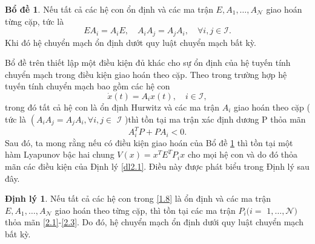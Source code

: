 \documentclass[12pt,a4paper]{report}
\theoremstyle{definition}
\newtheorem{dl}{Định lý}
\newtheorem{lemma}{Bổ đề}
\theoremstyle{definition}
\numberwithin{dl}{chapter}
\numberwithin{vd}{chapter}
\numberwithin{corollary}{chapter}
\numberwithin{lemma}{chapter}
\numberwithin{md}{chapter}
\numberwithin{dn}{chapter}
\numberwithin{cy}{chapter}
\numberwithin{nx}{chapter}
\begin{document}
\begin{lemma} \label{bd2.1}\cite{Zhai09a} Nếu tất cả các hệ con ổn định và các ma trận $E, A_{1}, \ldots, A_{\mathcal{N}}$ giao hoán từng cặp, tức là\\
\begin{equation}\label{2.29}
E A_{i}=A_{i} E, \quad A_{i} A_{j}=A_{j} A_{i}, \quad \forall i, j \in \mathcal{I} \text {.} 
\end{equation}
Khi đó hệ chuyển mạch ổn định dướt quy luật chuyển mạch bất kỳ.
\end{lemma}
Bổ đề trên thiết lập một điều kiện đủ khác cho sự ổn định của hệ tuyến tính chuyển mạch trong điều kiện giao hoán theo cặp. Theo \cite{Nar94} trong trường hợp hệ tuyến tính chuyển mạch bao gồm các hệ con
\begin{equation}\label{2.30}
\dot{x}(t)=A_{i} x(t), \quad i \in \mathcal{I}, 
\end{equation}
trong đó tất cả hệ con là ổn định Hurwitz và các ma trận $A_{i}$ giao hoán theo cặp  ( tức là $\left(A_{i} A_{j}=A_{j} A_{i}, \forall i, j \in\right.$ $\mathcal{I}$ )thì tồn tại ma trận xác định dương P thỏa mãn 
\begin{equation}\label{2.31}
A_{i}^{T} P+P A_{i}<0.
\end{equation}
Sau đó, ta mong rằng nếu có điều kiện giao hoán của Bổ đề \ref{bd2.1} thì tồn tại một hàm Lyapunov bậc hai chung $V(x)=x^{T} E^{T} P_{i} x$ cho mọi hệ con và do đó thỏa mãn các điều kiện của Định lý \ref{dl2.1}. Điều này được phát biểu trong Định lý sau đây.\\


\begin{dl}\label{dl2.2}
Nếu tất cả các hệ con trong \eqref{1.8} là ổn định và các ma trận $E, A_{1}, \ldots, A_{\mathcal{N}}$ giao hoán theo từng  cặp, thì tồn tại các ma trận $P_{i} (i=$ $1, \ldots, \mathcal{N})$ thỏa mãn \eqref{2.1}-\eqref{2.3}. Do đó, hệ chuyển mạch ổn định dưới quy luật chuyển mạch bất kỳ.
\end{dl}
\end{document}
